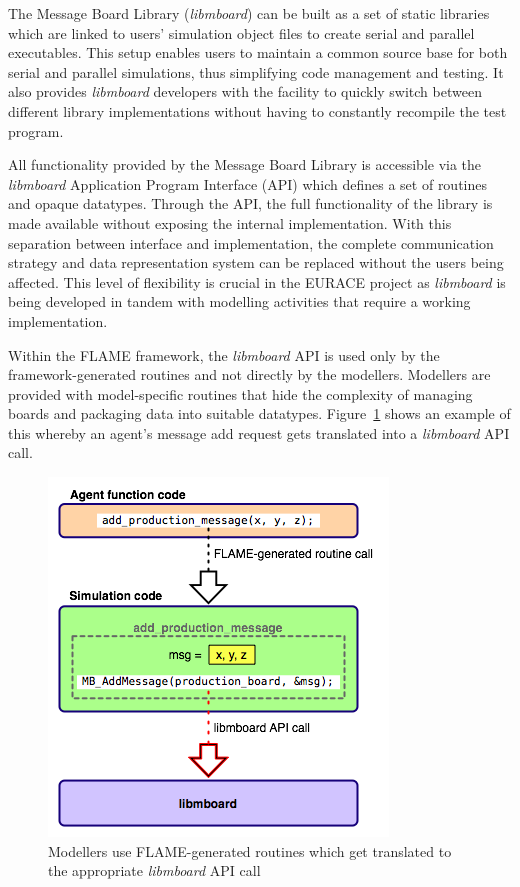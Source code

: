 The Message Board Library (\textit{libmboard}) can be built as a set of static libraries which are linked to users' simulation object files to create serial and parallel executables. This setup enables users to maintain a common source base for both serial and parallel simulations, thus simplifying code management and testing. It also provides \textit{libmboard} developers with the facility to quickly switch between different library implementations without having to constantly recompile the test program.

All functionality provided by the Message Board Library is accessible via the \textit{libmboard} Application Program Interface (API) which defines a set of routines and opaque datatypes. Through the API, the full functionality of the library is made available without exposing the internal implementation. With this separation between interface and implementation, the complete communication strategy and data representation system can be replaced without the users being affected. This level of flexibility is crucial in the EURACE project as \textit{libmboard} is being developed in tandem with modelling activities that require a working implementation.

Within the FLAME framework, the \textit{libmboard} API is used only by the framework-generated routines and not directly by the modellers. Modellers are provided with model-specific routines that hide the complexity of managing boards and packaging data into suitable datatypes. Figure~\ref{fig:mb_api_flame} shows an example of this whereby an agent's message add request gets translated into a \textit{libmboard} API call.

\begin{figure}[ht]
 \centering
  \includegraphics[scale=0.60]{mboard_codetranslate.png}
 \caption{Modellers use FLAME-generated routines which get translated to the appropriate \textit{libmboard} API call}
 \label{fig:mb_api_flame}
\end{figure}


